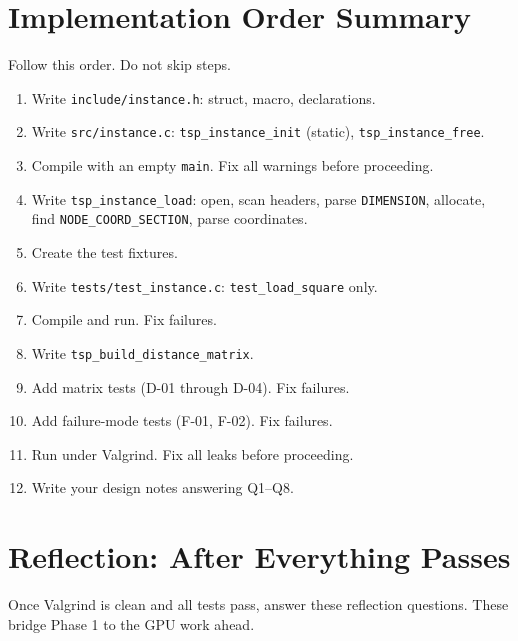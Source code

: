 \documentclass[11pt]{article}
\begin{document}
\newpage

\section{Implementation Order Summary}

Follow this order. Do not skip steps.

\begin{enumerate}[label=\textbf{Step \arabic*.}, leftmargin=*, itemsep=4pt]
  \item Write \texttt{include/instance.h}: struct, macro, declarations.
  \item Write \texttt{src/instance.c}: \texttt{tsp\_instance\_init} (static), \texttt{tsp\_instance\_free}.
  \item Compile with an empty \texttt{main}. Fix all warnings before proceeding.
  \item Write \texttt{tsp\_instance\_load}: open, scan headers, parse \texttt{DIMENSION}, allocate, find \texttt{NODE\_COORD\_SECTION}, parse coordinates.
  \item Create the test fixtures.
  \item Write \texttt{tests/test\_instance.c}: \texttt{test\_load\_square} only.
  \item Compile and run. Fix failures.
  \item Write \texttt{tsp\_build\_distance\_matrix}.
  \item Add matrix tests (D-01 through D-04). Fix failures.
  \item Add failure-mode tests (F-01, F-02). Fix failures.
  \item Run under Valgrind. Fix all leaks before proceeding.
  \item Write your design notes answering Q1--Q8.
\end{enumerate}

\newpage

\section{Reflection: After Everything Passes}

Once Valgrind is clean and all tests pass, answer these reflection questions. These bridge Phase 1 to the GPU work ahead.
\end{document}

